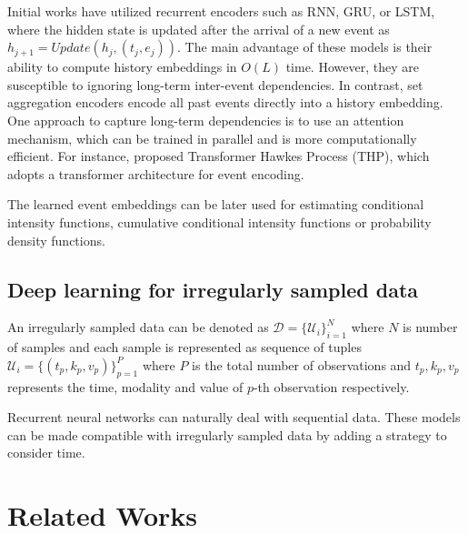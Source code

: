 \documentclass[journal,twoside,web]{ieeecolor}
\begin{document}
Initial works have utilized recurrent encoders such as RNN, GRU, or LSTM, where the hidden state is updated after the arrival of a new event as $h_{j+1}=Update(h_j,(t_j,e_j))$. The main advantage of these models is their ability to compute history embeddings in $O(L)$ time. However, they are susceptible to ignoring long-term inter-event dependencies.
In contrast, set aggregation encoders encode all past events directly into a history embedding. One approach to capture long-term dependencies is to use an attention mechanism, which can be trained in parallel and is more computationally efficient. For instance,\cite{zuoTransformerHawkesProcess2020a} proposed Transformer Hawkes Process (THP), which adopts a transformer architecture for event encoding.

The learned event embeddings can be later used for estimating conditional intensity functions, cumulative conditional intensity functions or probability density functions.


\subsection{Deep learning for irregularly sampled data}
An irregularly sampled data can be denoted as $\mathcal{D}=\{\mathcal{U}_i\}_{i=1}^{N}$ where $N$ is number of samples and each sample is represented as sequence of tuples $\mathcal{U}_i=\{(t_p,k_p,v_p)\}_{p=1}^{P}$ where $P$ is the total number of observations and $t_p, k_p, v_p$ represents the time, modality and value of $p$-th observation respectively.

Recurrent neural networks can naturally deal with sequential data. These models can be made compatible with irregularly sampled data by adding a strategy to consider time.

\section{Related Works}
\label{sec:Related Works}
\end{document}
